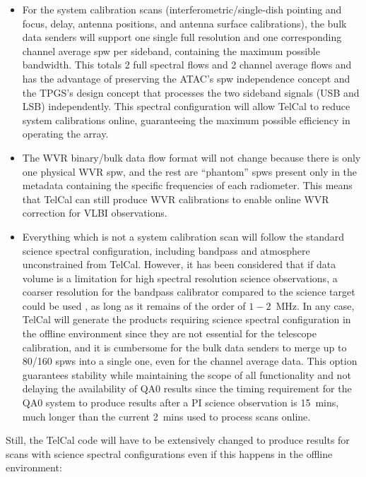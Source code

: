 \begin{itemize}[itemsep=-0.5em]
    \item For the system calibration scans (interferometric/single-dish pointing and focus, delay, antenna positions, and antenna surface calibrations), the bulk data senders will support one single full resolution and one corresponding channel average spw per sideband, containing the maximum possible bandwidth. This totals 2 full spectral flows and 2 channel average flows and has the advantage of preserving the ATAC's spw independence concept and the TPGS’s design concept that processes the two sideband signals (USB and LSB) independently. This spectral configuration will allow TelCal to reduce system calibrations online, guaranteeing the maximum possible efficiency in operating the array.
    \item The WVR binary/bulk data flow format will not change because there is only one physical WVR spw, and the rest are ``phantom'' \acp{spw} present only in the metadata containing the specific frequencies of each radiometer. This means that TelCal can still produce WVR calibrations to enable online WVR correction for VLBI observations.
    \item Everything which is not a system calibration scan will follow the standard science spectral configuration, including bandpass and atmosphere unconstrained from TelCal. However, it has been considered that if data volume is a limitation for high spectral resolution science observations, a coarser resolution for the bandpass calibrator compared to the science target could be used \cite{bandpassMemo}, as long as it remains of the order of $1-2$~MHz. In any case, TelCal will generate the products requiring science spectral configuration in the offline environment since they are not essential for the telescope calibration, and it is cumbersome for the bulk data senders to merge up to 80/160 \acp{spw} into a single one, even for the channel average data. This option guarantees stability while maintaining the scope of all functionality and not delaying the availability of QA0 results since the timing requirement for the QA0 system to produce results after a PI science observation is 15~mins, much longer than the current 2~mins used to process scans online.

\end{itemize}

Still, the TelCal code will have to be extensively changed to produce results for scans with science spectral configurations even if this happens in the offline environment:

